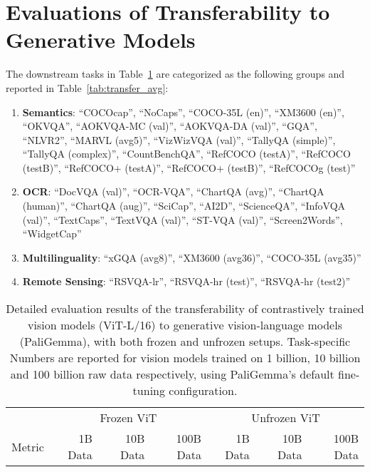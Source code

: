 \section{Evaluations of Transferability to Generative Models}
\label{appendix:transfer}

The downstream tasks in Table~\ref{tab:transfer_all} are categorized as the following groups and reported in Table~\ref{tab:transfer_avg}:

{\footnotesize

\begin{enumerate}
    \item \textbf{Semantics}: ``COCOcap'', ``NoCaps'', ``COCO-35L (en)'', ``XM3600 (en)'', ``OKVQA'', ``AOKVQA-MC (val)'', ``AOKVQA-DA (val)'', ``GQA'', ``NLVR2'', ``MARVL (avg5)'', ``VizWizVQA (val)'', ``TallyQA (simple)'', ``TallyQA (complex)'', ``CountBenchQA'', ``RefCOCO (testA)'', ``RefCOCO (testB)'', ``RefCOCO+ (testA)'', ``RefCOCO+ (testB)'', ``RefCOCOg (test)''
    \item \textbf{OCR}: ``DocVQA (val)'', ``OCR-VQA'', ``ChartQA (avg)'', ``ChartQA (human)'', ``ChartQA (aug)'', ``SciCap'', ``AI2D'', ``ScienceQA'', ``InfoVQA (val)'', ``TextCaps'', ``TextVQA (val)'', ``ST-VQA (val)'', ``Screen2Words'', ``WidgetCap''
    \item \textbf{Multilinguality}: ``xGQA (avg8)'', ``XM3600 (avg36)'', ``COCO-35L (avg35)''
    \item \textbf{Remote Sensing}: ``RSVQA-lr'', ``RSVQA-hr (test)'', ``RSVQA-hr (test2)''
\end{enumerate}


\begin{longtable}{l|rrr|rrr}
\caption{Detailed evaluation results of the transferability of contrastively trained vision models (ViT-L/16) to generative vision-language models (PaliGemma), with both frozen and unfrozen setups. Task-specific Numbers are reported for vision models trained on 1 billion, 10 billion and 100 billion raw data respectively, using PaliGemma's default fine-tuning configuration.}
\label{tab:transfer_all} \\

\toprule
& \multicolumn{3}{c|}{Frozen ViT} & \multicolumn{3}{c}{Unfrozen ViT} \\
\cmidrule(lr){2-4}\cmidrule(lr){5-7}
Metric & 1B Data & 10B Data & 100B Data & 1B Data & 10B Data & 100B Data \\
\midrule
\endfirsthead  %

\endhead  %


\end{longtable}}

